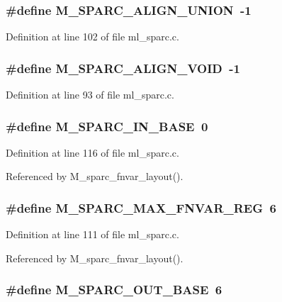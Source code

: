 \subsubsection{\setlength{\rightskip}{0pt plus 5cm}\#define M\_\-SPARC\_\-ALIGN\_\-UNION~-1}\label{ml__sparc_8c_0bb43402a7eadf28caa07ad0ef091d05}




Definition at line 102 of file ml\_\-sparc.c.
\subsubsection{\setlength{\rightskip}{0pt plus 5cm}\#define M\_\-SPARC\_\-ALIGN\_\-VOID~-1}\label{ml__sparc_8c_e758d55d512c0e130c7afa0d68727a05}




Definition at line 93 of file ml\_\-sparc.c.
\subsubsection{\setlength{\rightskip}{0pt plus 5cm}\#define M\_\-SPARC\_\-IN\_\-BASE~0}\label{ml__sparc_8c_da21947a3fc35d8b77013be011157573}




Definition at line 116 of file ml\_\-sparc.c.

Referenced by M\_\-sparc\_\-fnvar\_\-layout().
\subsubsection{\setlength{\rightskip}{0pt plus 5cm}\#define M\_\-SPARC\_\-MAX\_\-FNVAR\_\-REG~6}\label{ml__sparc_8c_4f0795b9249b6c7bab937b1c9c832ad9}




Definition at line 111 of file ml\_\-sparc.c.

Referenced by M\_\-sparc\_\-fnvar\_\-layout().
\subsubsection{\setlength{\rightskip}{0pt plus 5cm}\#define M\_\-SPARC\_\-OUT\_\-BASE~6}\label{ml__sparc_8c_51274194214aa0913a3743152e7a449a}




